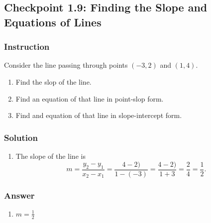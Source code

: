 \subsection*{Checkpoint 1.9: Finding the Slope and Equations of Lines}

\subsubsection*{Instruction}

Consider the line passing through points  $ (-3,2) $ and  $ (1,4) $.

\begin{enumerate}[label = (\alph*)]
  \item
    Find the slop of the line.
  \item
    Find an equation of that line in point-slop form.
  \item
    Find and equation of that line in slope-intercept form.
\end{enumerate}

\subsubsection*{Solution}

\begin{enumerate}[label = (\alph*)]
  \item
    The slope of the line is
    $$ \phantom{.}
m = \frac{y_2 - y_1}{x_2 - x_1} = \frac{4 - 2)}{1 - (-3)} = \frac{4 - 2)}{1 + 3} = \frac{2}{4} = \frac{1}{2}
.$$
\end{enumerate}

\subsubsection{Answer}

\begin{enumerate}[label = (\alph*)]
\item
$ m = \frac{1}{2} $
\end{enumerate}

